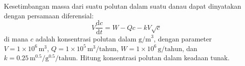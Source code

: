 \begin{soal}
\label{chapra_exe_6.25}
Kesetimbangan massa dari suatu polutan dalam suatu danau
dapat dinyatakan dengan persamaan diferensial:
\begin{equation*}
V\frac{\mathrm{d}c}{\mathrm{d}t} = W - Qc - kV\sqrt{c}
\end{equation*}
di mana $c$ adalah konsentrasi polutan dalam $\mathrm{g/m}^{3}$,
dengan parameter
$V = 1\times10^6\,\mathrm{m}^3$,
$Q = 1\times10^5\,\mathrm{m}^3/\mathrm{tahun}$,
$W = 1\times10^6\,\mathrm{g}/\mathrm{tahun}$, dan
$k = 0.25\,\mathrm{m}^{0.5}/\mathrm{g}^{0.5}/\mathrm{tahun}$.
Hitung konsentrasi polutan dalam keadaan tunak.
\end{soal}